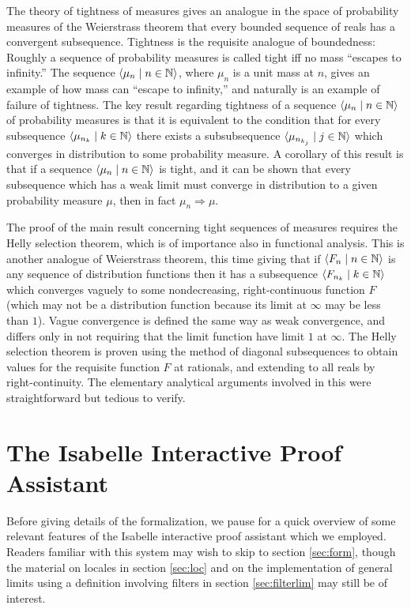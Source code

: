 \documentclass{article}
\theoremstyle{definition}
\newcommand{\bldseq}[2]{\langle{#1}\mid{#2}\rangle}
\begin{document}
The theory of tightness of measures gives an analogue in the space of probability measures of the Weierstrass theorem that every bounded sequence of reals has a convergent subsequence. Tightness is the requisite analogue of boundedness: Roughly a sequence of probability measures is called tight iff no mass ``escapes to infinity.'' The sequence $\bldseq{\mu_n}{n \in \N}$, where $\mu_n$ is a unit mass at $n$, gives an example of how mass can ``escape to infinity,'' and naturally is an example of failure of tightness. The key result regarding tightness of a sequence $\bldseq{\mu_n}{n \in \N}$ of probability measures is that it is equivalent to the condition that for every subsequence $\bldseq{\mu_{n_k}}{k \in \N}$ there exists a subsubsequence $\bldseq{\mu_{n_{k_j}}}{j \in \N}$ which converges in distribution to some probability measure. A corollary of this result is that if a sequence $\bldseq{\mu_n}{n \in \N}$ is tight, and it can be shown that every subsequence which has a weak limit must converge in distribution to a given probability measure $\mu$, then in fact $\mu_n \Rightarrow \mu$.

The proof of the main result concerning tight sequences of measures requires the Helly selection theorem, which is of importance also in functional analysis. This is another analogue of Weierstrass theorem, this time giving that if $\bldseq{F_n}{n \in \N}$ is any sequence of distribution functions then it has a subsequence $\bldseq{F_{n_k}}{k \in \N}$ which converges vaguely to some nondecreasing, right-continuous function $F$ (which may not be a distribution function because its limit at $\infty$ may be less than $1$). Vague convergence is defined the same way as weak convergence, and differs only in not requiring that the limit function have limit $1$ at $\infty$. The Helly selection theorem is proven using the method of diagonal subsequences to obtain values for the requisite function $F$ at rationals, and extending to all reals by right-continuity. The elementary analytical arguments involved in this were straightforward but tedious to verify.

\section{The Isabelle Interactive Proof Assistant}

Before giving details of the formalization, we pause for a quick overview of some relevant features of the Isabelle interactive proof assistant which we employed. Readers familiar with this system may wish to skip to section \ref{sec:form}, though the material on locales in section \ref{sec:loc} and on the implementation of general limits using a definition involving filters in section \ref{sec:filterlim} may still be of interest.
\end{document}
